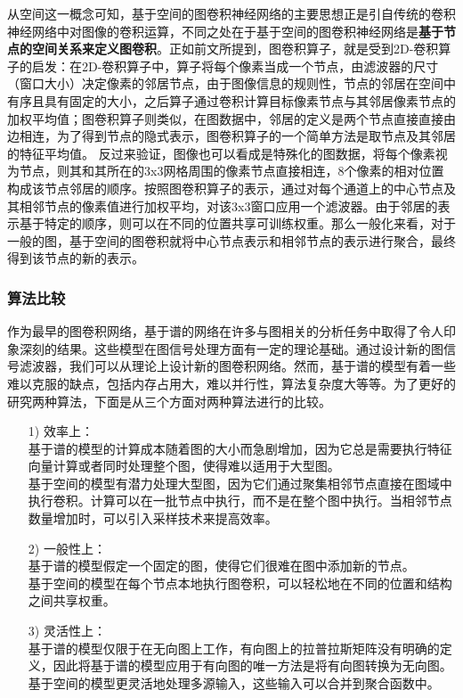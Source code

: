\documentclass[UTF8]{ctexart}
\begin{document}
从空间这一概念可知，基于空间的图卷积神经网络的主要思想正是引自传统的卷积神经网络中对图像的卷积运算，不同之处在于基于空间的图卷积神经网络是\textbf{基于节点的空间关系来定义图卷积}。正如前文所提到，图卷积算子，就是受到2D-卷积算子的启发：在2D-卷积算子中，算子将每个像素当成一个节点，由滤波器的尺寸（窗口大小）决定像素的邻居节点，由于图像信息的规则性，节点的邻居在空间中有序且具有固定的大小，之后算子通过卷积计算目标像素节点与其邻居像素节点的加权平均值；图卷积算子则类似，在图数据中，邻居的定义是两个节点直接直接由边相连，为了得到节点的隐式表示，图卷积算子的一个简单方法是取节点及其邻居的特征平均值。 反过来验证，图像也可以看成是特殊化的图数据，将每个像素视为节点，则其和其所在的3x3网格周围的像素节点直接相连，8个像素的相对位置构成该节点邻居的顺序。按照图卷积算子的表示，通过对每个通道上的中心节点及其相邻节点的像素值进行加权平均，对该3x3窗口应用一个滤波器。由于邻居的表示基于特定的顺序，则可以在不同的位置共享可训练权重。那么一般化来看，对于一般的图，基于空间的图卷积就将中心节点表示和相邻节点的表示进行聚合，最终得到该节点的新的表示。 \par

\subsubsection{算法比较}

作为最早的图卷积网络，基于谱的网络在许多与图相关的分析任务中取得了令人印象深刻的结果。这些模型在图信号处理方面有一定的理论基础。通过设计新的图信号滤波器，我们可以从理论上设计新的图卷积网络。然而，基于谱的模型有着一些难以克服的缺点，包括内存占用大，难以并行性，算法复杂度大等等。为了更好的研究两种算法，下面是从三个方面对两种算法进行的比较。

\begin{itemize}
\item [1)] 
效率上： \\ 基于谱的模型的计算成本随着图的大小而急剧增加，因为它总是需要执行特征向量计算或者同时处理整个图，使得难以适用于大型图。 \\ 基于空间的模型有潜力处理大型图，因为它们通过聚集相邻节点直接在图域中执行卷积。计算可以在一批节点中执行，而不是在整个图中执行。当相邻节点数量增加时，可以引入采样技术来提高效率。 \par
\item [2)] 
一般性上： \\ 基于谱的模型假定一个固定的图，使得它们很难在图中添加新的节点。\\ 基于空间的模型在每个节点本地执行图卷积，可以轻松地在不同的位置和结构之间共享权重。 \par
\item [3)] 
灵活性上： \\ 基于谱的模型仅限于在无向图上工作，有向图上的拉普拉斯矩阵没有明确的定义，因此将基于谱的模型应用于有向图的唯一方法是将有向图转换为无向图。 \\ 基于空间的模型更灵活地处理多源输入，这些输入可以合并到聚合函数中。
\end{itemize}
\end{document}
